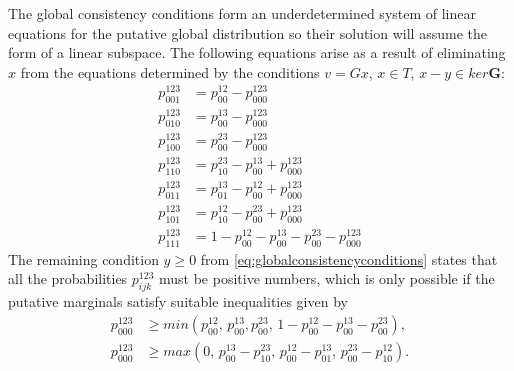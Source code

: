 The global consistency conditions form an underdetermined system of linear equations for the putative global distribution so their solution will assume the form of a linear subspace.  The following equations arise as a result of eliminating $x$ from the equations determined by the conditions $v=Gx$, $x \in T$, $x-y \in ker \mathbf{G}$:
\begin{equation}
\begin{aligned}\label{eq:globalpositivityeqs}
p^{123}_{001} &= p^{12}_{00} - p^{123}_{000} \\
p^{123}_{010} &= p^{13}_{00} - p^{123}_{000} \\
p^{123}_{100} &= p^{23}_{00} - p^{123}_{000} \\
p^{123}_{110} &= p^{23}_{10} - p^{13}_{00} + p^{123}_{000} \\
p^{123}_{011} &= p^{13}_{01} - p^{12}_{00} + p^{123}_{000} \\
p^{123}_{101} &= p^{12}_{10} - p^{23}_{00} + p^{123}_{000} \\
p^{123}_{111} &= 1 - p^{12}_{00} - p^{13}_{00} - p^{23}_{00} - p^{123}_{000}
\end{aligned}
\end{equation}
The remaining condition $y \geq 0$ from \autoref{eq:globalconsistencyconditions} states that all the probabilities $p^{123}_{ijk}$ must be positive numbers, which is only possible if the putative marginals satisfy suitable inequalities given by
\begin{equation}
\begin{aligned}\label{eq:globalpositivityineqs}
p^{123}_{000} &\geq min(p^{12}_{00},\, p^{13}_{00},p^{23}_{00},\, 1 - p^{12}_{00} - p^{13}_{00} - p^{23}_{00}),\\
 p^{123}_{000} &\geq max(0,\, p^{13}_{00}-p^{23}_{10},\, p^{12}_{00}-p^{13}_{01},\, p^{23}_{00}-p^{12}_{10}).
\end{aligned}
\end{equation}
